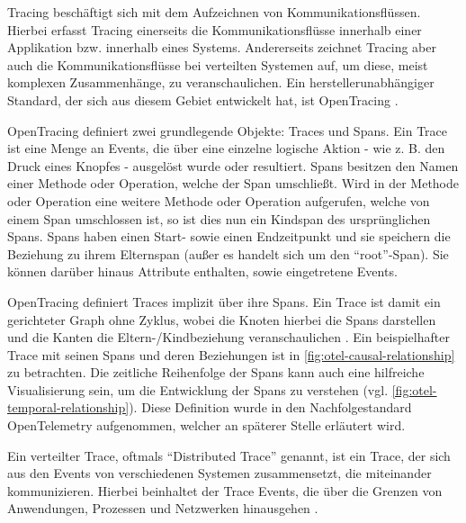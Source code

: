 Tracing beschäftigt sich mit dem Aufzeichnen von Kommunikationsflüssen. Hierbei erfasst Tracing einerseits die Kommunikationsflüsse innerhalb einer Applikation bzw. innerhalb eines Systems. Andererseits zeichnet Tracing aber auch die Kommunikationsflüsse bei verteilten Systemen auf, um diese, meist komplexen Zusammenhänge, zu veranschaulichen. Ein herstellerunabhängiger Standard, der sich aus diesem Gebiet entwickelt hat, ist OpenTracing \cite{OpenTracing}.

OpenTracing definiert zwei grundlegende Objekte: Traces und Spans. Ein Trace ist eine Menge an Events, die über eine einzelne logische Aktion - wie z. B. den Druck eines Knopfes - ausgelöst wurde oder resultiert. Spans besitzen den Namen einer Methode oder Operation, welche der Span umschließt. Wird in der Methode oder Operation eine weitere Methode oder Operation aufgerufen, welche von einem Span umschlossen ist, so ist dies nun ein Kindspan des ursprünglichen Spans. Spans haben einen Start- sowie einen Endzeitpunkt und sie speichern die Beziehung zu ihrem Elternspan (außer es handelt sich um den \enquote{root}-Span). Sie können darüber hinaus Attribute enthalten, sowie eingetretene Events.

OpenTracing definiert Traces implizit über ihre Spans. Ein Trace ist damit ein gerichteter Graph ohne Zyklus, wobei die Knoten hierbei die Spans darstellen und die Kanten die Eltern-/Kindbeziehung veranschaulichen \cite{OpenTracingSpecification}. Ein beispielhafter Trace mit seinen Spans und deren Beziehungen ist in \autoref{fig:otel-causal-relationship} zu betrachten. Die zeitliche Reihenfolge der Spans kann auch eine hilfreiche Visualisierung sein, um die Entwicklung der Spans zu verstehen (vgl. \autoref{fig:otel-temporal-relationship}). Diese Definition wurde in den Nachfolgestandard OpenTelemetry aufgenommen, welcher an späterer Stelle erläutert wird.

Ein verteilter Trace, oftmals \enquote{Distributed Trace} genannt, ist ein Trace, der sich aus den Events von verschiedenen Systemen zusammensetzt, die miteinander kommunizieren. Hierbei beinhaltet der Trace Events, die über die Grenzen von Anwendungen, Prozessen und Netzwerken hinausgehen \cite{OpenTracingSpecification}.

